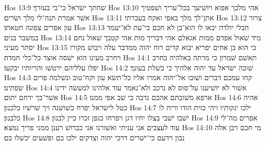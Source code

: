 Hos 13:9  שׁחתך ישׂראל כי־בי בעזרך׃
Hos 13:10  אהי מלכך אפוא ויושׁיעך בכל־עריך ושׁפטיך אשׁר אמרת תנה־לי מלך ושׂרים׃
Hos 13:11  אתן־לך מלך באפי ואקח בעברתי׃
Hos 13:12  צרור עון אפרים צפונה חטאתו׃
Hos 13:13  חבלי יולדה יבאו לו הוא־בן לא חכם כי־עת לא־יעמד במשׁבר בנים׃
Hos 13:14  מיד שׁאול אפדם ממות אגאלם אהי דבריך מות אהי קטבך שׁאול נחם יסתר מעיני׃
Hos 13:15  כי הוא בן אחים יפריא יבוא קדים רוח יהוה ממדבר עלה ויבושׁ מקורו ויחרב מעינו הוא ישׁסה אוצר כל־כלי חמדה׃
Hos 14:1  תאשׁם שׁמרון כי מרתה באלהיה בחרב יפלו עלליהם ירטשׁו והריותיו יבקעו׃
Hos 14:2  שׁובה ישׂראל עד יהוה אלהיך כי כשׁלת בעונך׃
Hos 14:3  קחו עמכם דברים ושׁובו אל־יהוה אמרו אליו כל־תשׂא עון וקח־טוב ונשׁלמה פרים שׂפתינו׃
Hos 14:4  אשׁור לא יושׁיענו על־סוס לא נרכב ולא־נאמר עוד אלהינו למעשׂה ידינו אשׁר־בך ירחם יתום׃
Hos 14:5  ארפא משׁובתם אהבם נדבה כי שׁב אפי ממנו׃
Hos 14:6  אהיה כטל לישׂראל יפרח כשׁושׁנה ויך שׁרשׁיו כלבנון׃
Hos 14:7  ילכו ינקותיו ויהי כזית הודו וריח לו כלבנון׃
Hos 14:8  ישׁבו ישׁבי בצלו יחיו דגן ויפרחו כגפן זכרו כיין לבנון׃
Hos 14:9  אפרים מה־לי עוד לעצבים אני עניתי ואשׁורנו אני כברושׁ רענן ממני פריך נמצא׃
Hos 14:10  מי חכם ויבן אלה נבון וידעם כי־ישׁרים דרכי יהוה וצדקים ילכו בם ופשׁעים יכשׁלו בם׃


